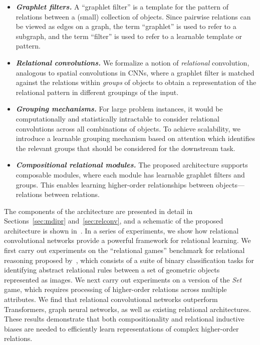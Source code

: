 \begin{itemize}%
    \item \textit{\bfseries Graphlet filters.} A ``graphlet filter'' is a template for the pattern of relations between a (small) collection of objects. 
    Since pairwise relations can be viewed as edges on a graph, the term ``graphlet'' is used to refer to a subgraph, and the term ``filter'' is used to refer to a learnable template or pattern.
    \item \textit{\bfseries Relational convolutions.} 
    We formalize a notion of \textit{relational} convolution, analogous to spatial convolutions in CNNs, where a graphlet filter is matched against the relations within \textit{groups} of objects to obtain a representation of the relational pattern in different groupings of the input.
    \item \textit{\bfseries Grouping mechanisms.} For large problem instances, it would be computationally and statistically intractable to consider relational convolutions across all combinations of objects. To achieve scalability, we introduce a learnable grouping mechanism based on attention which identifies the relevant groups that should be considered for the downstream task.
    \item \textit{\bfseries Compositional relational modules.} The proposed architecture supports composable modules, where each module has learnable graphlet filters and groups. This enables learning higher-order relationships between objects---relations between relations.
\end{itemize}


The components of the architecture are presented in detail in Sections~\ref{sec:mdipr} and~\ref{sec:relconv}, and a schematic of the proposed architecture is shown in~. In a series of experiments, we show how relational convolutional networks provide a powerful framework
for relational learning. We first carry out experiments on the ``relational games'' benchmark for relational reasoning proposed by~\citet{shanahanExplicitlyRelationalNeural}, which consists of a suite of binary classification tasks for identifying abstract relational rules between a set of geometric objects represented as images. 
We next carry out experiments on a version of the \textit{Set} game, which requires processing of higher-order relations across multiple attributes. We find that relational convolutional networks outperform Transformers, graph neural networks, as well as existing relational architectures. These results demonstrate that both compositionality and relational inductive biases are needed to efficiently learn representations of complex higher-order relations.

